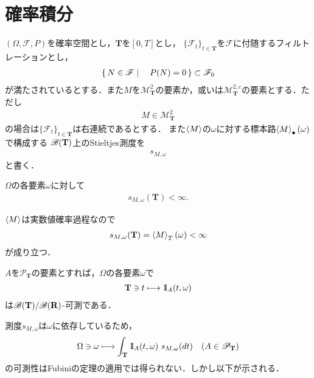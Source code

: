 \section{確率積分}
	$(\Omega,\mathscr{F},P)$を確率空間とし，$\mathbf{T}$を$[0,T]$とし，
	$\{\mathscr{F}_t\}_{t \in \mathbf{T}}$を$\mathscr{F}$に付随するフィルトレーションとし，
	\begin{align}
		\left\{\, N \in \mathscr{F} \mid \quad P(N) = 0\, \right\} \subset \mathscr{F}_0
	\end{align}
	が満たされているとする．また$M$を$\mathscr{M}^2_{\mathbf{T}}$の要素か，或いは$\mathscr{M}^{2,c}_{\mathbf{T}}$の要素とする．ただし
	\begin{align}
		M \in \mathscr{M}^2_{\mathbf{T}}
	\end{align}
	の場合は$\{\mathscr{F}_t\}_{t \in \mathbf{T}}$は右連続であるとする．
	また$\inprod<M>$の$\omega$に対する標本路$\inprod<M>_\bullet(\omega)$で構成する
	$\mathscr{B}(\mathbf{T})$上のStieltjes測度を
	\begin{align}
		s_{M,\omega}
	\end{align}
	と書く．
	
	\begin{screen}
		\begin{thm}
			$\Omega$の各要素$\omega$に対して
			\begin{align}
				s_{M,\omega}(\mathbf{T}) < \infty.
			\end{align}
		\end{thm}
	\end{screen}
	
	\begin{prf}
		$\inprod<M>$は実数値確率過程なので
		\begin{align}
			s_{M,\omega}(\mathbf{T}) = \inprod<M>_T(\omega) < \infty
		\end{align}
		が成り立つ．
		\QED
	\end{prf}
	
	\begin{screen}
		\begin{thm}
			$A$を$\mathscr{P}_{\mathbf{T}}$の要素とすれば，$\Omega$の各要素$\omega$で
			\begin{align}
				\mathbf{T} \ni t \longmapsto \mbox{1}\hspace{-0.25em}\mbox{l}_A(t,\omega)
			\end{align}
			は$\mathscr{B}(\mathbf{T})/\mathscr{B}(\mathbf{R})$-可測である．
		\end{thm}
	\end{screen}
	
	測度$s_{M,\omega}$は$\omega$に依存しているため，
	\begin{align}
		\Omega \ni \omega \longmapsto \int_{\mathbf{T}} \mbox{1}\hspace{-0.25em}\mbox{l}_A(t,\omega)\ s_{M,\omega}(dt)
		\quad (A \in \mathscr{P}_{\mathbf{T}})
	\end{align}
	の可測性はFubiniの定理の適用では得られない．しかし以下が示される．
	
